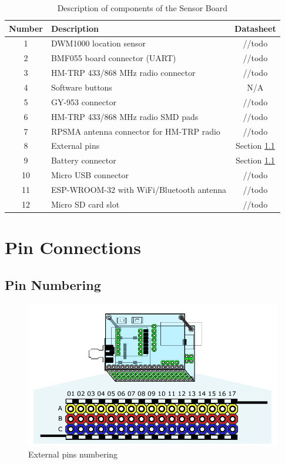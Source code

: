 \begin{table}[H]
	\centering
	\begin{tabular}{|c|l|c|}
		\hline
		Number & Description & Datasheet\\
		\hline \hline
		1 & DWM1000 location sensor & //todo \\
		2 & BMF055 board connector (UART) & //todo \\
		3 & HM-TRP 433/868 MHz radio connector & //todo \\
		4 & Software buttons & N/A \\
		5 & GY-953 connector & //todo \\
		6 & HM-TRP 433/868 MHz radio SMD pads & //todo \\
		7 & RPSMA antenna connector for HM-TRP radio & //todo \\
		8 & External pins & Section \ref{pinNumbering} \\
		9 & Battery connector & Section \ref{pinNumbering} \\
		10 & Micro USB connector & //todo \\
		11 & ESP-WROOM-32 with WiFi/Bluetooth antenna & //todo \\
		12 & Micro SD card slot & //todo \\
		\hline
	\end{tabular}
	\caption{Description of components of the Sensor Board}
	\label{table:componentsDescription}
\end{table}

\section{Pin Connections}

\subsection{Pin Numbering}
\label{pinNumbering}

\begin{figure}[H]
	\centering
	\includegraphics[scale=1]{img/externalPins.pdf}
	\caption{External pins numbering}
	\label{fig:externalPins}
\end{figure}

